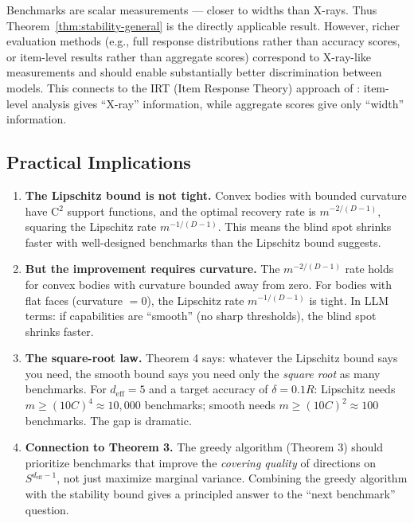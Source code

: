 \begin{remark}
Benchmarks are scalar measurements --- closer to widths than X-rays. Thus Theorem~\ref{thm:stability-general} is the directly applicable result. However, richer evaluation methods (e.g., full response distributions rather than accuracy scores, or item-level results rather than aggregate scores) correspond to X-ray-like measurements and should enable substantially better discrimination between models. This connects to the IRT (Item Response Theory) approach of \citet{polo2024tinybenchmarks}: item-level analysis gives ``X-ray'' information, while aggregate scores give only ``width'' information.
\end{remark}


\subsection{Practical Implications}

\begin{enumerate}
  \item \textbf{The Lipschitz bound is not tight.} Convex bodies with bounded curvature have C$^2$ support functions, and the optimal recovery rate is $m^{-2/(D-1)}$, squaring the Lipschitz rate $m^{-1/(D-1)}$. This means the blind spot shrinks faster with well-designed benchmarks than the Lipschitz bound suggests.
  
  \item \textbf{But the improvement requires curvature.} The $m^{-2/(D-1)}$ rate holds for convex bodies with curvature bounded away from zero. For bodies with flat faces (curvature $= 0$), the Lipschitz rate $m^{-1/(D-1)}$ is tight. In LLM terms: if capabilities are ``smooth'' (no sharp thresholds), the blind spot shrinks faster.
  
  \item \textbf{The square-root law.} Theorem 4 says: whatever the Lipschitz bound says you need, the smooth bound says you need only the \emph{square root} as many benchmarks. For $d_{\mathrm{eff}} = 5$ and a target accuracy of $\delta = 0.1R$: Lipschitz needs $m \geq (10C)^4 \approx 10{,}000$ benchmarks; smooth needs $m \geq (10C)^2 \approx 100$ benchmarks. The gap is dramatic.
  
  \item \textbf{Connection to Theorem 3.} The greedy algorithm (Theorem 3) should prioritize benchmarks that improve the \emph{covering quality} of directions on $S^{d_{\mathrm{eff}}-1}$, not just maximize marginal variance. Combining the greedy algorithm with the stability bound gives a principled answer to the ``next benchmark'' question.
\end{enumerate}
